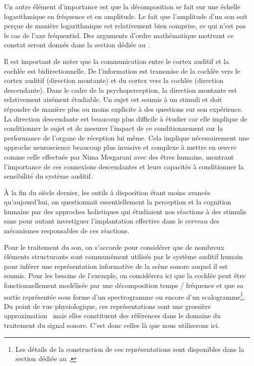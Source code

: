 Un autre élément d'importance est que la décomposition se fait sur une échelle logarithmique en fréquence et en amplitude. Le fait que l'amplitude d'un son soit perçue de manière logarithmique est relativement bien comprise, ce qui n'est pas le cas de l'axe fréquentiel. Des arguments d'ordre mathématique motivant ce constat seront donnés dans la section dédiée au .

Il est important de noter que la communication entre le cortex auditif et la cochlée est bidirectionnelle. De l'information est transmise de la cochlée vers le cortex auditif (direction montante) et du cortex vers la cochlée (direction descendante). Dans le cadre de la psychoperception, la direction montante est relativement aisément étudiable. Un sujet est soumis à un stimuli et doit répondre de manière plus ou moins explicite à des questions sur son expérience. La direction descendante est beaucoup plus difficile à étudier car elle implique de conditionner le sujet et de mesurer l'impact de ce conditionnement sur la performance de l'organe de réception lui même. Cela implique nécessairement une approche \og neuroscience \fg beaucoup plus invasive et complexe à mettre en \oe{}uvre comme celle effectuée par Nima Mesgarani avec des êtres humains, montrant l'importance de ces connexions descendantes et leurs capacités à conditionner la sensibilité du système auditif.~\cite{mesgarani2012selective}

\`A la fin du siècle dernier, les outils à disposition étant moins avancés qu'aujourd'hui, on questionnait essentiellement la perception et la cognition humaine par des approches \og holistiques \fg qui étudiaient nos réactions à des stimulis sans pour autant investiguer l'implantation effective dans le cerveau des mécanismes responsables de ces réactions.

Pour le traitement du son, on s'accorde pour considérer que de nombreux éléments structurants sont communément utilisés par le système auditif humain pour inférer une représentation informative de la scène sonore auquel il est soumis. Pour les besoins de l'exemple, on considérera ici que la cochlée peut être fonctionnellement modélisée par une décomposition temps / fréquence et que sa sortie représentée sous forme d'un spectrogramme ou encore d'un scalogramme\footnote{Les détails de la construction de ces représentations sont disponibles dans la section dédiée au .}. Du point de vue physiologique, ces représentations sont une grossière approximation~\cite{lyon2017human} mais elles constituent des références dans le domaine du traitement du signal sonore. C'est donc celles là que nous utiliserons ici.

